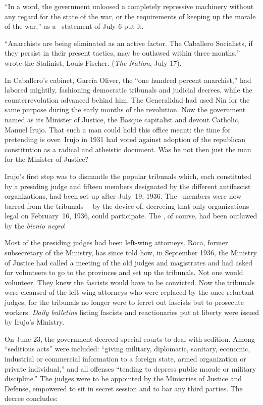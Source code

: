 ``In a word, the government unloosed a completely repressive machinery without any regard for the state of the war, or the requirements of keeping up the morale of the war,'' as a \FAI\ statement of July 6 put it.

``Anarchists are being eliminated as an active factor. The Caballero Socialists, if they persist in their present tactics, may be outlawed within three months,'' wrote the Stalinist, Louis Fischer. (\emph{The Nation}, July 17).

In Caballero’s cabinet, Garc\'ia Oliver, the ``one hundred percent anarchist,'' had labored mightily, fashioning democratic tribunals and judicial decrees, while the counterrevolution advanced behind him. The Generalidad had used Nin for the same purpose during the early months of the revolution. Now the government named as its Minister of Justice, the Basque capitalist and devout Catholic, Manuel Irujo. That such a man could hold this office meant: the time for pretending is over. Irujo in 1931 had voted against adoption of the republican constitution as a radical and atheistic document. Was he not then just the man for the Minister of Justice?

Irujo’s first step was to dismantle the popular tribunals which, each constituted by a presiding judge and fifteen members designated by the different antifascist organizations, had been set up after July~19, 1936. The \FAI\ members were now barred from the tribunals~-- by the device of, decreeing that only organizations legal on February~16, 1936, could participate. The \FAI, of course, had been outlawed by the \emph{bienio negro}!

Most of the presiding judges had been left-wing attorneys. Roca, former subsecretary of the Ministry, has since told how, in September 1936, the Ministry of Justice had called a meeting of the old judges and magistrates and had asked for volunteers to go to the provinces and set up the tribunals. Not one would volunteer. They knew the fascists would have to be convicted. Now the tribunals were cleansed of the left-wing attorneys who were replaced by the once-reluctant judges, for the tribunals no longer were to ferret out fascists but to prosecute workers. \emph{Daily bulletins} listing fascists and reactionaries put at liberty were issued by Irujo’s Ministry.

On June 23, the government decreed special courts to deal with sedition. Among ``seditious acts'' were included: ``giving military, diplomatic, sanitary, economic, industrial or commercial information to a foreign state, armed organization or private individual,'' and all offenses ``tending to depress public morale or military discipline.'' The judges were to be appointed by the Ministries of Justice and Defense, empowered to sit in secret session and to bar any third parties. The decree concludes:

